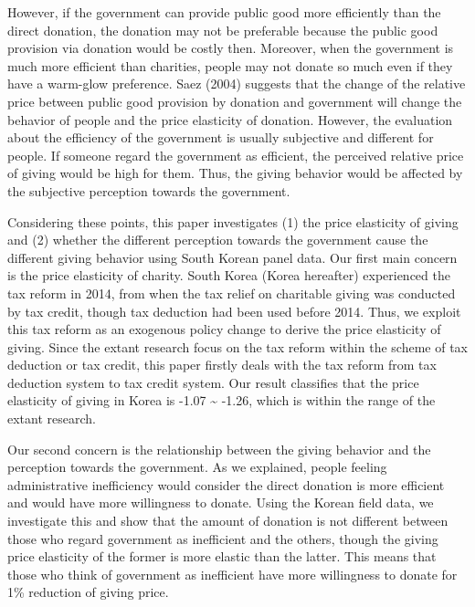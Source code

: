 \documentclass[ review  , 3p ]{elsarticle}
\begin{document}
  However, if the government can provide public good more efficiently than the direct donation, the donation may not be preferable because the public good provision via donation would be costly then.
  Moreover, when the government is much more efficient than charities, people may not donate so much even if they have a warm-glow preference. Saez (2004) suggests that the change of the relative price between public good provision by donation and government will change the behavior of people and the price elasticity of donation.
  However, the evaluation about the efficiency of the government is usually subjective and different for people. If someone regard the government as efficient, the perceived relative price of giving would be high for them. Thus, the giving behavior would be affected by the subjective perception towards the government.
  
  Considering these points, this paper investigates (1) the price elasticity of giving and (2) whether the different perception towards the government cause the different giving behavior using South Korean panel data.
  Our first main concern is the price elasticity of charity. South Korea (Korea hereafter) experienced the tax reform in 2014, from when the tax relief on charitable giving was conducted by tax credit, though tax deduction had been used before 2014. Thus, we exploit this tax reform as an exogenous policy change to derive the price elasticity of giving. Since the extant research focus on the tax reform within the scheme of tax deduction or tax credit, this paper firstly deals with the tax reform from tax deduction system to tax credit system.
  Our result classifies that the price elasticity of giving in Korea is -1.07 \textasciitilde{} -1.26, which is within the range of the extant research.
  
  Our second concern is the relationship between the giving behavior and the perception towards the government. As we explained, people feeling administrative inefficiency would consider the direct donation is more efficient and would have more willingness to donate. Using the Korean field data, we investigate this and show that the amount of donation is not different between those who regard government as inefficient and the others, though the giving price elasticity of the former is more elastic than the latter. This means that those who think of government as inefficient have more willingness to donate for 1\% reduction of giving price.
  
\end{document}
